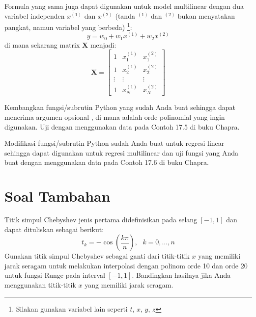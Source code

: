 Formula yang sama juga dapat digunakan untuk model multilinear dengan
dua variabel independen $x^{(1)}$ dan $x^{(2)}$ (tanda $^{(1)}$ dan $^{(2)}$ bukan
menyatakan pangkat, namun variabel yang berbeda)
\footnote{Silakan gunakan variabel lain seperti $t$, $x$, $y$, $z$}:
\begin{equation}
y = w_{0} + w_{1} x^{(1)} + w_{2} x^{(2)}
\end{equation}
di mana sekarang matrix $\mathbf{X}$ menjadi:
\begin{equation}
\mathbf{X} = \begin{bmatrix}
1 & x^{(1)}_{1} & x^{(2)}_{1} \\
1 & x^{(1)}_{2} & x^{(2)}_{2} \\
\vdots & \vdots & \vdots \\
1 & x^{(1)}_{N} & x^{(2)}_{N}
\end{bmatrix}
\end{equation}

\begin{soal}
Kembangkan fungsi/subrutin Python yang sudah Anda buat sehingga dapat menerima argumen
opsional , di mana  adalah orde polinomial yang ingin digunakan.
Uji dengan menggunakan data pada Contoh 17.5 di buku Chapra.
\end{soal}

\begin{soal}
Modifikasi fungsi/subrutin Python sudah Anda buat untuk regresi linear sehingga
dapat digunakan untuk regresi multilinear dan uji fungsi yang Anda buat
dengan menggunakan data pada Contoh 17.6 di buku Chapra.
\end{soal}



\section{Soal Tambahan}


















\begin{soal}
Titik simpul Chebyshev jenis pertama didefinisikan pada selang $[-1,1]$ dan
dapat dituliskan sebagai berikut:
\begin{equation}
t_{k} = -\cos\left( \frac{k\pi}{n} \right), \,\,\,\, k = 0, \ldots, n
\end{equation}
Gunakan titik simpul Chebyshev sebagai ganti dari titik-titik $x$ yang memiliki jarak seragam
untuk melakukan interpolasi dengan polinom orde 10 dan orde 20 untuk fungsi Runge
pada interval $[-1,1]$.
Bandingkan hasilnya jika Anda menggunakan titik-titik $x$ yang memiliki jarak
seragam.
\end{soal}



